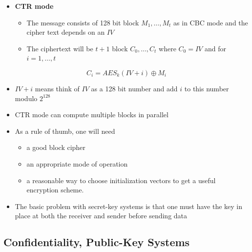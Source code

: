 \documentclass[11pt]{article}
\begin{document}
\begin{itemize}
\item \textbf{CTR mode}
\begin{itemize}
\item The message consists of 128 bit block \(M_1, \dots, M_t\) as in CBC mode and the cipher text depends on an \(IV\)
\item The ciphertext will be \(t+1\) block \(C_0, \dots, C_t\) where \(C_0=IV\) and for \(i=1, \dots, t\)
\end{itemize}
\end{itemize}
\begin{equation}
  C_i=AES_k(IV+i) \oplus M_i
\end{equation}
\begin{itemize}
\item \(IV+i\) means think of \(IV\) as a 128 bit number and add \(i\) to this number modulo \(2^{128}\)
\item CTR mode can compute multiple blocks in parallel

\item As a rule of thumb, one will need
\begin{itemize}
\item a good block cipher
\item an appropriate mode of operation
\item a reasonable way to choose initialization vectors to get a useful encryption scheme.
\end{itemize}

\item The basic problem with secret-key systems is that one must have the key in place at both the receiver and sender before sending data
\end{itemize}

\subsection{Confidentiality, Public-Key Systems}
\label{sec:org0a66896}
\end{document}
